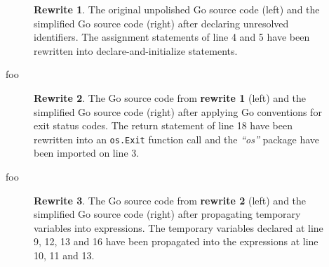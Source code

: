 \begin{figure}[htbp]
	\centering
	\begin{subfigure}[t]{0.45\textwidth}
		
	\end{subfigure}
	\qquad
	\begin{subfigure}[t]{0.45\textwidth}
		
	\end{subfigure}
	\caption{\textbf{Rewrite 1}. The original unpolished Go source code (left) and the simplified Go source code (right) after declaring unresolved identifiers. The assignment statements of line 4 and 5 have been rewritten into declare-and-initialize statements.}
	\label{fig:rewrite_1}
\end{figure}

foo

\begin{figure}[htbp]
	\centering
	\begin{subfigure}[t]{0.45\textwidth}
		
	\end{subfigure}
	\qquad
	\begin{subfigure}[t]{0.45\textwidth}
		
	\end{subfigure}
	\caption{\textbf{Rewrite 2}. The Go source code from \textbf{rewrite 1} (left) and the simplified Go source code (right) after applying Go conventions for exit status codes. The return statement of line 18 have been rewritten into an \texttt{os.Exit} function call and the \textit{``os''} package have been imported on line 3.}
	\label{fig:rewrite_2}
\end{figure}

foo

\begin{figure}[htbp]
	\centering
	\begin{subfigure}[t]{0.45\textwidth}
		
	\end{subfigure}
	\qquad
	\begin{subfigure}[t]{0.45\textwidth}
		
	\end{subfigure}
	\caption{\textbf{Rewrite 3}. The Go source code from \textbf{rewrite 2} (left) and the simplified Go source code (right) after propagating temporary variables into expressions. The temporary variables declared at line 9, 12, 13 and 16 have been propagated into the expressions at line 10, 11 and 13.}
	\label{fig:rewrite_3}
\end{figure}

